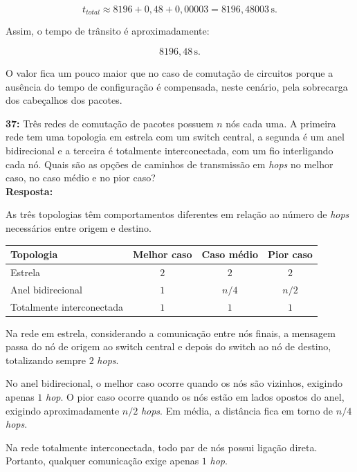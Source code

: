 \documentclass[12pt,a4paper]{report}
\begin{document}
\[
t_{total} \approx 8196 + 0{,}48 + 0{,}00003 = 8196{,}48003\,\text{s}.
\]

Assim, o tempo de trânsito é aproximadamente:

\[
\boxed{8196{,}48\,\text{s}}.
\]

O valor fica um pouco maior que no caso de comutação de circuitos porque a ausência do tempo de configuração é compensada, neste cenário, pela sobrecarga dos cabeçalhos dos pacotes.


\vspace{0.6cm}

\noindent \textbf{37:} Três redes de comutação de pacotes possuem $n$ nós cada uma. A primeira rede tem uma topologia em estrela com um switch central, a segunda é um anel bidirecional e a terceira é totalmente interconectada, com um fio interligando cada nó. Quais são as opções de caminhos de transmissão em \textit{hops} no melhor caso, no caso médio e no pior caso?\\
\textbf{Resposta:}

As três topologias têm comportamentos diferentes em relação ao número de \textit{hops} necessários entre origem e destino.

\begin{center}
\begin{tabular}{lccc}
\toprule
\textbf{Topologia} & \textbf{Melhor caso} & \textbf{Caso médio} & \textbf{Pior caso} \\
\midrule
Estrela & $2$ & $2$ & $2$ \\
Anel bidirecional & $1$ & $n/4$ & $n/2$ \\
Totalmente interconectada & $1$ & $1$ & $1$ \\
\bottomrule
\end{tabular}
\end{center}

Na rede em estrela, considerando a comunicação entre nós finais, a mensagem passa do nó de origem ao switch central e depois do switch ao nó de destino, totalizando sempre $2$ \textit{hops}.

No anel bidirecional, o melhor caso ocorre quando os nós são vizinhos, exigindo apenas $1$ \textit{hop}. O pior caso ocorre quando os nós estão em lados opostos do anel, exigindo aproximadamente $n/2$ \textit{hops}. Em média, a distância fica em torno de $n/4$ \textit{hops}.

Na rede totalmente interconectada, todo par de nós possui ligação direta. Portanto, qualquer comunicação exige apenas $1$ \textit{hop}.
\end{document}
